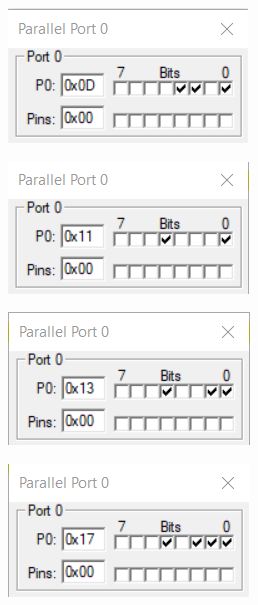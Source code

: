 \documentclass{lab_sheet}
\begin{document}
\begin{figure}[H]
\begin{subfigure}{.5\textwidth}
  \centering
  \includegraphics[frame,width=.8\linewidth]{../Figures/1_7_f.png}  
  \label{fig:prob7-f}
  \caption{}
\end{subfigure}
\begin{subfigure}{.5\textwidth}
  \centering
    \includegraphics[frame,width=.8\linewidth]{../Figures/1_7_g.png}  
  \label{fig:prob7-g}
  \caption{}
\end{subfigure}
\begin{subfigure}{.5\textwidth}
  \centering
  \includegraphics[frame,width=.8\linewidth]{../Figures/1_7_h.png}   
  \caption{}
  \label{fig:prob7-h}
\end{subfigure}
\begin{subfigure}{.5\textwidth}
  \centering
  \includegraphics[frame,width=.8\linewidth]{../Figures/1_7_i.png}   

\end{subfigure}
\end{figure}
\end{document}
